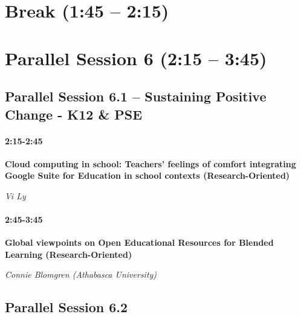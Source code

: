 \documentclass[
]{book}
\begin{document}
\hypertarget{break-145-215-1}{%
\section*{Break (1:45 -- 2:15)}\label{break-145-215-1}}

\hypertarget{parallel-session-6-215-345}{%
\section*{Parallel Session 6 (2:15 -- 3:45)}\label{parallel-session-6-215-345}}

\hypertarget{parallel-session-6.1-sustaining-positive-change---k12-pse}{%
\subsection*{Parallel Session 6.1 -- Sustaining Positive Change - K12 \& PSE}\label{parallel-session-6.1-sustaining-positive-change---k12-pse}}

\begin{secondary}
\hypertarget{section}{%
\paragraph{2:15-2:45}\label{section}}

\textbf{Cloud computing in school: Teachers' feelings of comfort
integrating Google Suite for Education in school contexts
(Research-Oriented)}

\emph{Vi Ly}
\end{secondary}

\begin{secondary}
\hypertarget{section}{%
\paragraph{2:45-3:45}\label{section}}

\textbf{Global viewpoints on Open Educational Resources for Blended
Learning (Research-Oriented)}

\emph{Connie Blomgren (Athabasca University)}
\end{secondary}

\hypertarget{parallel-session-6.2}{%
\subsection*{Parallel Session 6.2}\label{parallel-session-6.2}}
\end{document}
